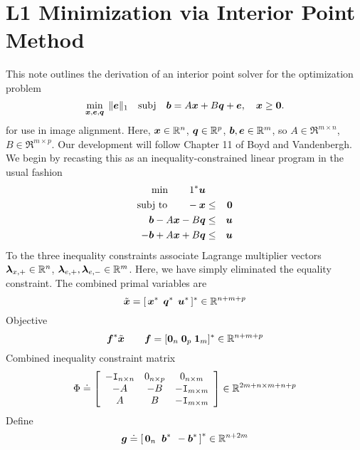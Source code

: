 
\section{L1 Minimization via Interior Point Method}

This note outlines the derivation of an interior point solver for the optimization problem
\begin{equation}
\min_{{\boldsymbol{x}},\boldsymbol{e},{\boldsymbol q}}\;  \| \boldsymbol{e} \|_1 \quad \mathrm{subj} \quad \boldsymbol{b} = A {\boldsymbol{x}} + B {\boldsymbol q} + \boldsymbol{e}, \quad {\boldsymbol{x}} \ge \boldsymbol{0}.
\end{equation}
for use in image alignment. Here, ${\boldsymbol{x}} \in \mathbb R^n$, ${\boldsymbol q} \in \mathbb R^p$, $\boldsymbol{b}, \boldsymbol{e} \in \mathbb R^m$, so $A \in \Re^{m \times n}$, $B \in \Re^{m\times p}$. Our development will follow Chapter 11 of Boyd and Vandenbergh. We begin by recasting this as an inequality-constrained linear program in the usual fashion
\begin{eqnarray*}
\min \qquad 1^* \boldsymbol{u} \\
\textup{subj to} \qquad -{\boldsymbol{x}} &\le& \boldsymbol{0} \\
\boldsymbol{b} - A{\boldsymbol{x}} - B{\boldsymbol q} &\le& \boldsymbol{u} \\
-\boldsymbol{b} + A {\boldsymbol{x}} + B{\boldsymbol q} &\le& \boldsymbol{u}
\end{eqnarray*}
To the three inequality constraints associate Lagrange multiplier vectors $\boldsymbol{\lambda}_{x,+} \in \mathbb R^n$, $\boldsymbol{\lambda}_{e,+}, \boldsymbol{\lambda}_{e,-} \in \mathbb R^m$. Here, we have simply eliminated the equality constraint. The combined primal variables are 
\begin{equation}
\tilde {{\boldsymbol{x}}} = [ \, {\boldsymbol{x}}^* \;\, {\boldsymbol q}^* \;\, \boldsymbol{u}^* \, ]^* \in \mathbb R^{n+m+p}
\end{equation}
Objective
\begin{equation}
\boldsymbol{f}^* \tilde {{\boldsymbol{x}}} \qquad   \boldsymbol{f} = [ \boldsymbol{0}_n \; \boldsymbol{0}_p \; {\boldsymbol{1}}_m ]^* \in \mathbb R^{n+m+p}
\end{equation}
Combined inequality constraint matrix 
\begin{equation}
\Phi \doteq \left[ \begin{array}{ccc} 
-\mathtt{I}_{n \times n} & 0_{n \times p} & 0_{n \times m} \\
-A &  -B & - \mathtt{I}_{m \times m} \\
A  &   B  &  - \mathtt{I}_{m \times m} \\
\end{array} \right] \in \mathbb R^{2m + n \times m + n + p}
\end{equation}
Define 
\begin{equation}
\boldsymbol{g} \doteq \left[ \, \boldsymbol{0}_n \;\; \boldsymbol{b}^* \;\, -\boldsymbol{b}^* \, \right]^* \in \mathbb R^{n + 2m}
\end{equation}
